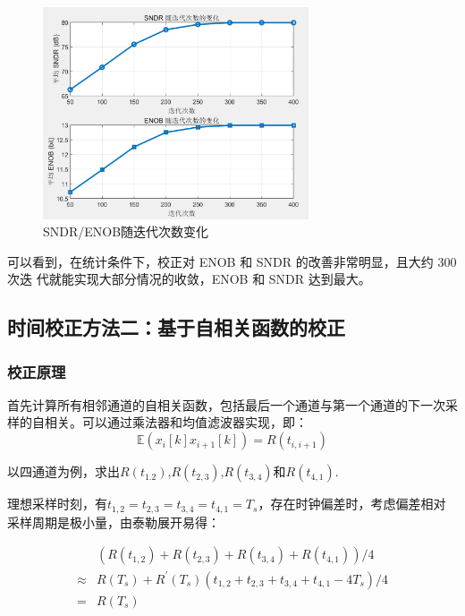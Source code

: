 \documentclass[cs4size,a4paper]{ctexart}
\numberwithin{equation}{section}
\numberwithin{table}{section}
\numberwithin{figure}{section}
\begin{document}
		\begin{figure}[H]
			\centering
			\includegraphics[width=0.7\textwidth]{figure/result6.png}
			\caption{SNDR/ENOB随迭代次数变化} 
			\label{fig:result6}
		\end{figure}
		
		可以看到，在统计条件下，校正对 ENOB 和 SNDR 的改善非常明显，且大约 300 次迭
		代就能实现大部分情况的收敛，ENOB 和 SNDR 达到最大。
		
		
		\subsection{时间校正方法二：基于自相关函数的校正}
		
		\subsubsection{校正原理}
		
		\noindent
		首先计算所有相邻通道的自相关函数，包括最后一个通道与第一个通道的下一次采样的自相关。可以通过乘法器和均值滤波器实现，即：
		\begin{equation}
			\mathbb{E}\left(x_i[k] x_{i+1}[k]\right)=R\left(t_{i, i+1}\right)
		\end{equation}
		
		以四通道为例，求出$R\left(t_{1.2}\right)$,$R\left(t_{2,3}\right)$,$R\left(t_{3,4}\right)$和$R\left(t_{4,1}\right)$.
		
		理想采样时刻，有$t_{1,2}=t_{2,3}=t_{3,4}=t_{4,1}=T_s$，存在时钟偏差时，考虑偏差相对采样周期是极小量，由泰勒展开易得：
		
		\begin{equation}
			\begin{aligned}
				& \left(R\left(t_{1,2}\right)+R\left(t_{2,3}\right)+R\left(t_{3,4}\right)+R\left(t_{4,1}\right)\right) / 4 \\
				\approx & R\left(T_s\right)+R^{\prime}\left(T_s\right)\left(t_{1,2}+t_{2,3}+t_{3,4}+t_{4,1}-4 T_s\right) / 4 \\
				= & R\left(T_s\right)
			\end{aligned}
		\end{equation}
		
\end{document}
